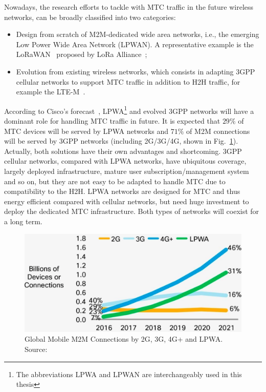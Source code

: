 Nowadays, the research efforts to tackle with MTC traffic in the future wireless networks, can be broadly classified into two categories: \begin{itemize}[leftmargin=*, noitemsep]
	\item Design from scratch of M2M-dedicated wide area networks, i.e., the emerging Low Power Wide Area Network (LPWAN). A representative example is the LoRaWAN~\cite{lora/specification} proposed by LoRa Alliance~\cite{lora_alliance};
	\item Evolution from existing wireless networks, which consists in adapting 3GPP cellular networks to support MTC traffic in addition to H2H traffic, for example the LTE-M~\cite{ratasuk2014narrowband}.
\end{itemize}
According to Cisco's forecast~\cite{cisco2017forecast}, LPWA\footnote{The abbreviations LPWA and LPWAN are interchangeably used in this thesis} and evolved 3GPP networks will have a dominant role for handling MTC traffic in future. It is expected that $29\%$ of MTC devices will be served by LPWA networks and $71\%$ of M2M connections will be served by 3GPP networks (including 2G/3G/4G, shown in Fig.~\ref{fig:m2m-evolution-trend}). Actually, both solutions have their own advantages and shortcoming. 3GPP cellular networks, compared with LPWA networks, have ubiquitous coverage, largely deployed infrastructure, mature user subscription/management system and so on, but they are not easy to be adapted to handle MTC due to compatibility to the H2H. LPWA networks are designed for MTC and thus energy efficient compared with cellular networks, but need huge investment to deploy the dedicated MTC infrastructure. Both types of networks will coexist for a long term.
\begin{figure}[h]
	\centering
	\includegraphics[width=0.8\linewidth]{Chapter1/Figures/Global_Mobile_M2M_Connections.eps}
	\caption{Global Mobile M2M Connections by 2G, 3G, 4G+ and LPWA. Source:~\cite{cisco2017forecast}}
	\label{fig:m2m-evolution-trend}
\end{figure}

